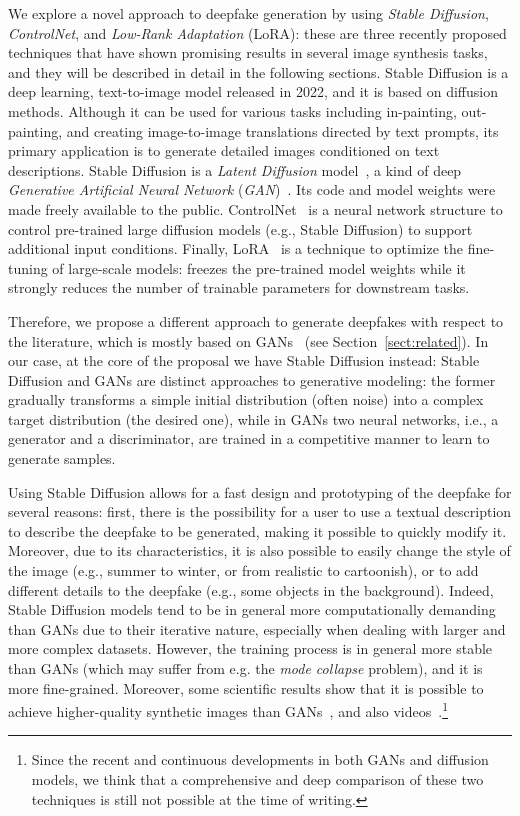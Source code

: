 \documentclass[preprint]{elsarticle}
\begin{document}
We  explore a novel approach to deepfake generation by using  \emph{Stable Diffusion}, \emph{ControlNet}, and \emph{Low-Rank Adaptation} (LoRA): these are three recently proposed techniques that  have shown promising results in several image synthesis tasks, and they will be described in detail in the following sections. Stable Diffusion is a deep learning, text-to-image model released in 2022,  and it is based on diffusion methods. Although it can be used for various tasks including in-painting, out-painting, and creating image-to-image translations directed by text prompts, its primary application is to generate detailed images conditioned on text descriptions. Stable Diffusion is a \emph{Latent Diffusion} model~\cite{rombach2022highresolution}, a kind of deep \emph{Generative Artificial Neural Network} (\emph{GAN})~\cite{GAN}. Its code and model weights were made freely available to the public.
ControlNet~\cite{zhang2023adding} is a neural network structure to control pre-trained large diffusion models (e.g., Stable Diffusion) to support additional input conditions. Finally, LoRA~\cite{hu2021lora} is a technique to optimize the fine-tuning of large-scale models: freezes the pre-trained model weights while it strongly reduces the number of trainable parameters for downstream tasks.

Therefore, we propose a different approach to generate deepfakes with respect to the literature, which is mostly based on GANs~\cite{surveydgen1} (see Section~\ref{sect:related}). In our case, at the core of the proposal we have Stable Diffusion instead: Stable Diffusion and GANs are distinct approaches to generative modeling: the former gradually transforms a simple initial distribution (often noise) into a complex target distribution (the desired one), while in GANs two neural networks, i.e., a generator and a discriminator, are trained in a competitive manner  to learn to generate samples. 

Using Stable Diffusion allows for a fast design and prototyping of the deepfake for several reasons: first, there is the possibility for a user to use a textual description to describe the deepfake to be generated, making it possible to quickly modify it. Moreover, due to its characteristics, it is also possible to easily change the style of the image (e.g., summer to winter, or from realistic to cartoonish), or to add different details to the deepfake (e.g., some objects in the background). Indeed, Stable Diffusion models tend to be in general more computationally demanding than GANs due to their iterative nature, especially when dealing with larger and more complex datasets. However, the training process is in general more stable than GANs (which may suffer from e.g. the \emph{mode collapse} problem), and  it is more fine-grained. Moreover, some scientific results show that it is possible to achieve higher-quality synthetic images than GANs~\cite{dmbetter,dmbetter2}, and also videos~\cite{dmbetter3}.\footnote{Since the recent and continuous developments in both GANs and diffusion models, we think that a comprehensive and deep comparison of these two techniques is still not possible at the time of writing.}
\end{document}
